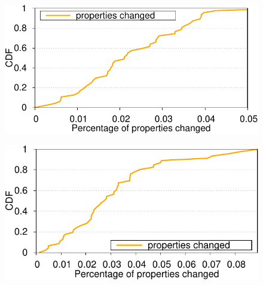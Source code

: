 \begin{figure}[t]
\centering
\includegraphics[width=0.9\columnwidth]{figs/cdf_bigdata_hr_new.pdf}
\label{fig:properties-hrs}
\end{figure}

\begin{figure}[t]
\centering
\includegraphics[width=0.9\columnwidth]{figs/cdf_bigdata_day_new.pdf}
\label{fig:properties-day}
\end{figure}


